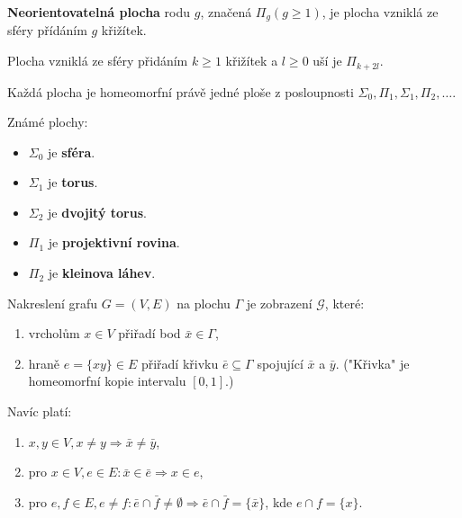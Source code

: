 \begin{definice}
	\textbf{Neorientovatelná plocha} rodu $g$, značená $\Pi_{g} (g \geq 1)$, je plocha vzniklá ze sféry přídáním $g$ křižítek.
\end{definice}

\begin{fakt}
	Plocha vzniklá ze sféry přidáním $k \geq 1$ křižítek a $l \geq 0$ uší je $\Pi_{k+2l}$.
\end{fakt}

\begin{fakt}
	Každá plocha je homeomorfní právě jedné ploše z posloupnosti $\Sigma_{0}, \Pi_{1}, \Sigma_{1}, \Pi_{2}, \dots$.
\end{fakt}

\begin{definice}
	Známé plochy:
	
	\begin{itemize}
		\item $\Sigma_{0}$ je \textbf{sféra}.
		\item $\Sigma_{1}$ je \textbf{torus}.
		\item $\Sigma_{2}$ je \textbf{dvojitý torus}.
		\item $\Pi_{1}$ je \textbf{projektivní rovina}.
		\item $\Pi_{2}$ je \textbf{kleinova láhev}.
	\end{itemize}
\end{definice}

\begin{definice}
	Nakreslení grafu $G = (V,E)$ na plochu $\Gamma$ je zobrazení $\mathcal{G}$, které:
	
	\begin{enumerate}
		\item vrcholům $x \in V$ přiřadí bod $\bar{x} \in \Gamma$,
		\item hraně $e = \{xy\} \in E$ přiřadí křivku $\bar{e} \subseteq \Gamma$ spojující $\bar{x}$ a $\bar{y}$. ("Křivka" je homeomorfní kopie intervalu $[0,1]$.)
	\end{enumerate}
	
	Navíc platí:
	
	\begin{enumerate}
		\item $x,y \in V, x \neq y \Rightarrow \bar{x} \neq \bar{y}$,
		\item pro $x \in V, e \in E: \bar{x} \in \bar{e} \Rightarrow x \in e$,
		\item pro $e, f \in E, e \neq f: \bar{e} \cap \bar{f} \neq \emptyset \Rightarrow \bar{e} \cap \bar{f} = \{\bar{x}\}$, kde $e \cap f = \{x\}$.
	\end{enumerate}
\end{definice}

